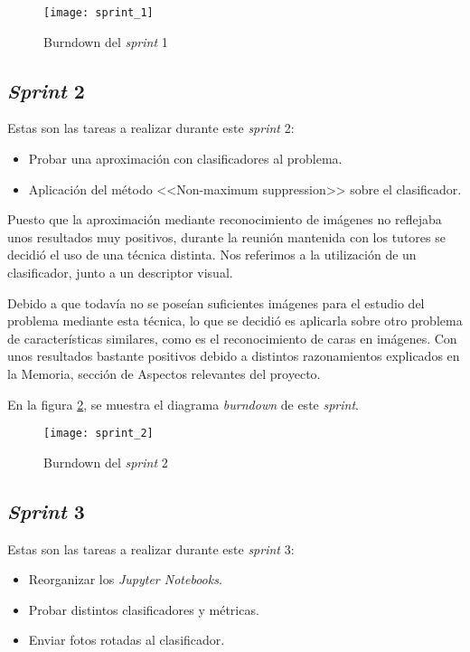 \begin{figure}
\centering
\texttt{[image: sprint\_1]}
\caption{Burndown del \textit{sprint} 1}
\label{fig:A.1.2}
\end{figure}

\subsection{\textit{Sprint} 2}
Estas son las tareas a realizar durante este \textit{sprint} 2:

\begin{itemize}
	\item Probar una aproximación con clasificadores al problema.
	\item Aplicación del método <<Non-maximum suppression>> sobre el clasificador.
\end{itemize}

Puesto que la aproximación mediante reconocimiento de imágenes no reflejaba unos resultados muy positivos, durante la reunión mantenida con los tutores se decidió el uso de una técnica distinta. Nos referimos a la utilización  de un clasificador, junto a un descriptor visual.

Debido a que todavía no se poseían suficientes imágenes para el estudio del problema mediante esta técnica, lo que se decidió es aplicarla sobre otro problema de características similares, como es el reconocimiento de caras en imágenes. Con unos resultados bastante positivos debido a distintos razonamientos explicados en la Memoria, sección de Aspectos relevantes del proyecto.

En la figura \ref{fig:A.1.3}, se muestra el diagrama \textit{burndown} de este \textit{sprint}.

\begin{figure}
\centering
\texttt{[image: sprint\_2]}
\caption{Burndown del \textit{sprint} 2}
\label{fig:A.1.3}
\end{figure}

\subsection{\textit{Sprint} 3}
Estas son las tareas a realizar durante este \textit{sprint} 3:

\begin{itemize}
	\item Reorganizar los \textit{Jupyter Notebooks}.
	\item Probar distintos clasificadores y métricas.
	\item Enviar fotos rotadas al clasificador.
\end{itemize}

